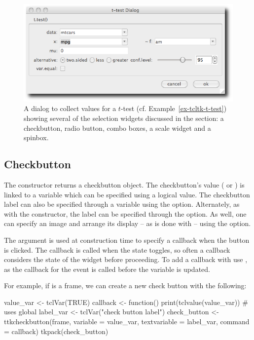 \begin{figure}
  \centering
  \includegraphics[width=.75\textwidth]{fig-tcltk-t-test.png}
  \caption{A dialog to collect values for a $t$-test (cf.
    Example~\ref{ex-tcltk-t-test}) showing several of the selection
    widgets discussed in the section: a checkbutton, radio button,
    combo boxes, a scale widget and a spinbox.}
  \label{fig:fig-tcltk-t-test}
\end{figure}

\subsection{Checkbutton}
\label{sec:tcltk:checkboxes}

The  constructor returns a checkbutton
object. The checkbutton's value ( or ) is linked
to a \TCL\/ variable which can be specified using a logical value.
The checkbutton label can also be specified through a \TCL\/ variable
using the  option.  Alternately,
as with the  constructor, the label can be specified
through the  option. As well, one can
specify an image and arrange its display -- as is done with
 -- using the 
option.

The  argument is used at construction
time to specify a callback when the button is clicked. The callback is
called when the state toggles, so often a callback considers the state
of the widget before proceeding.  To add a callback with
 use , as the callback
for the event  is called before the variable is
updated.

For example, if  is a frame, we can create a new check button
with the following:

\begin{Schunk}
\begin{Sinput}
 value_var <- tclVar(TRUE)
 callback <- function() print(tclvalue(value_var))   # uses global
 label_var <- tclVar("check button label")
 check_button <- 
   ttkcheckbutton(frame, variable = value_var, 
                  textvariable = label_var, command = callback)
 tkpack(check_button)
\end{Sinput}
\end{Schunk}


